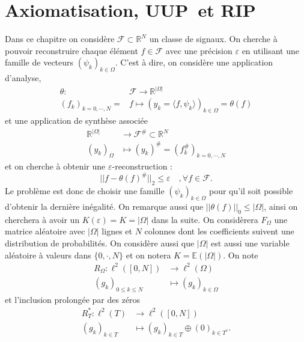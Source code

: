 \section{Axiomatisation, \textbf{UUP} et \textbf{RIP}}
Dans ce chapitre on considère $\mathcal{F} \subset \mathbb{R}^N$ un classe de signaux.
On cherche à pouvoir reconstruire chaque élément $f\in \mathcal{F}$ avec une précision $\varepsilon$ en utilisant une famille de vecteurs $(\psi_k)_{k \in \Omega}$.
\newline
C'est à dire, on considère une application d'analyse,
\begin{align}
	\theta : 	&\mathcal{F} \longrightarrow \mathbb{R}^{|\Omega|}\\
	(f_k)_{k = 0, \cdots, N} = &f \longmapsto (y_k = \langle f, \psi_k \rangle )_{k\in \Omega} = \theta(f)
\end{align}
et une application de synthèse associée
\begin{align}
	\mathbb{R}^{|\Omega|} &\longrightarrow \mathcal{F}^\# \subset \mathbb{R}^N \\
	(y_k)_\Omega &\longmapsto (y_k)^\# = (f_k ^\#)_{k = 0, \cdots, N}
\end{align}
et on cherche à obtenir une $\varepsilon$-reconstruction :
\begin{equation}
	|| f- \theta(f)^\#||_2 \leq \varepsilon \quad, \forall f \in \mathcal{F}. 
\end{equation}
Le problème est donc de choisir une famille $(\psi_k)_{k \in \Omega}$ pour qu'il soit possible d'obtenir la dernière inégalité.
\newline
On remarque aussi que $||\theta(f)||_0 \leq |\Omega|$, ainsi on cherchera à avoir un $K(\varepsilon) = K = |\Omega|$ dans la suite.
\newline
On considèrera $F_\Omega$ une matrice aléatoire avec $|\Omega|$ lignes et $N$ colonnes dont les coefficients suivent une distribution de probabilités.
On considère aussi que $|\Omega|$ est aussi une variable aléatoire à valeurs dans $\{0, \cdot, N\}$ et on notera $K = \mathbb{E}(|\Omega|)$.
On note
\begin{align}
	R_\Omega : \ell^2([0, N]) &\longrightarrow \ell^2(\Omega) \\
		(g_k)_{0\leq k\leq N} &\longmapsto (g_k)_{k\in \Omega}
\end{align}
et l'inclusion prolongée par des zéros
\begin{align}
	R_T^* : \ell^2(T) &\longrightarrow \ell^2([0,N])\\
		(g_k)_{k \in T} &\longmapsto (g_k)_{k\in T} \oplus (0)_{k\in T^c}.
\end{align}
